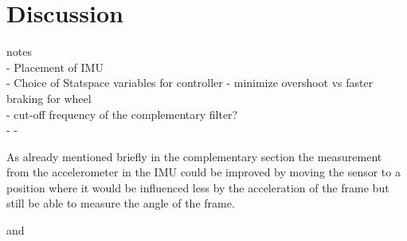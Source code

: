 \chapter{Discussion}

{\Large notes} \\
- Placement of IMU\\
- Choice of Statspace variables for controller - minimize overshoot vs faster braking for wheel\\
- cut-off frequency of the complementary filter?\\
- 
- 


As already mentioned briefly in the complementary section the measurement from the accelerometer in the IMU could be improved by moving the sensor to a position where it would be influenced less by the acceleration of the frame but still be able to measure the angle of the frame. 


 and 